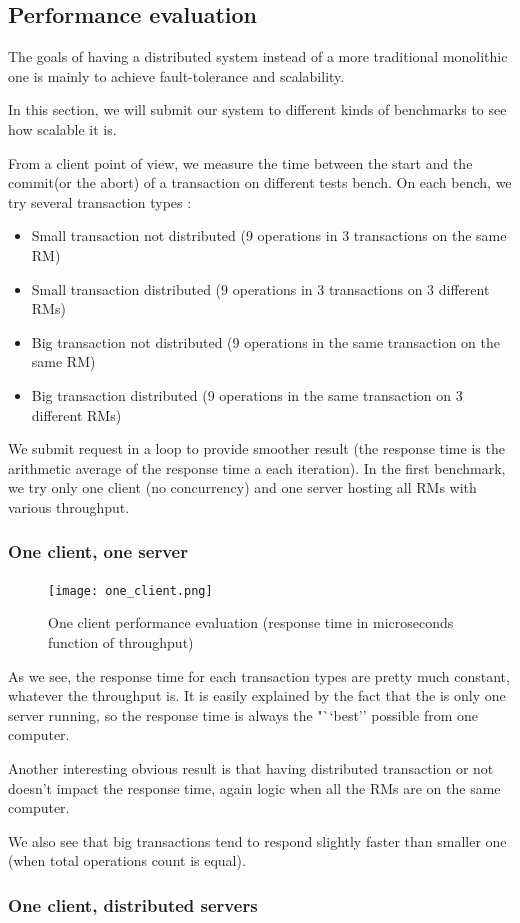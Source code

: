 \documentclass[a4paper]{article}
\begin{document}
\subsection{Performance evaluation}
The goals of having a distributed system instead of a more traditional monolithic one is mainly to achieve fault-tolerance and scalability.

In this section, we will submit our system to different kinds of benchmarks to see how scalable it is.

From a client point of view, we measure the time between the start and the commit(or the abort) of a transaction on different tests bench.
On each bench, we try several transaction types :
\begin{itemize}
\item Small transaction not distributed (9 operations in 3 transactions on the same RM)
\item Small transaction distributed (9 operations in 3 transactions on 3 different RMs)
\item Big transaction not distributed (9 operations in the same transaction on the same RM)
\item Big transaction distributed (9 operations in the same transaction on 3 different RMs)
\end{itemize}
We submit request in a loop to provide smoother result (the response time is the arithmetic average of the response time a each iteration).
In the first benchmark, we try only one client (no concurrency) and one server hosting all RMs with various throughput.

\subsubsection{One client, one server}
\begin{figure}[h!]
  \centering
	\texttt{[image: one\_client.png]}
  \caption{One client performance evaluation (response time in microseconds function of throughput)}
  \label{oneclient}
\end{figure}

As we see, the response time for each transaction types are pretty much constant, whatever the throughput is. It is easily explained by the fact that  the is only one server running, so the response time is always the "``best'' possible from one computer.

Another interesting obvious result is that having distributed transaction or not doesn't impact the response time, again logic when all the RMs are on the same computer.

We also see that big transactions tend to respond slightly faster than smaller one (when total operations count is equal).

\subsubsection{One client, distributed servers}

%
%
\end{document}
